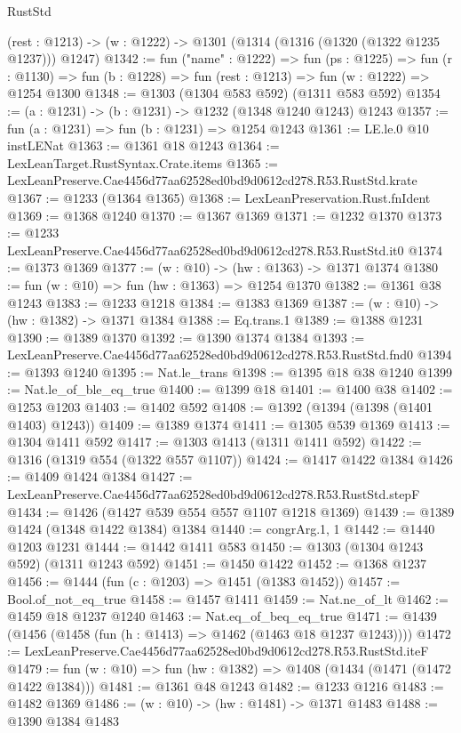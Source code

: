 \begin{lexlean}{RustStd}
\begin{coremodule}
  (rest : @1213) -> (w : @1222) -> @1301 (@1314 (@1316 (@1320 (@1322 @1235 @1237))) @1247)
@1342 := fun ("name" : @1222) =>
  fun (ps : @1225) =>
  fun (r : @1130) => fun (b : @1228) => fun (rest : @1213) => fun (w : @1222) => @1254 @1300
@1348 := @1303 (@1304 @583 @592) (@1311 @583 @592)
@1354 := (a : @1231) -> (b : @1231) -> @1232 (@1348 @1240 @1243) @1243
@1357 := fun (a : @1231) => fun (b : @1231) => @1254 @1243
@1361 := LE.le.{0} @10 instLENat
@1363 := @1361 @18 @1243
@1364 := LexLeanTarget.RustSyntax.Crate.items
@1365 := LexLeanPreserve.Cae4456d77aa62528ed0bd9d0612cd278.R53.RustStd.krate
@1367 := @1233 (@1364 @1365)
@1368 := LexLeanPreservation.Rust.fnIdent
@1369 := @1368 @1240
@1370 := @1367 @1369
@1371 := @1232 @1370
@1373 := @1233 LexLeanPreserve.Cae4456d77aa62528ed0bd9d0612cd278.R53.RustStd.it0
@1374 := @1373 @1369
@1377 := (w : @10) -> (hw : @1363) -> @1371 @1374
@1380 := fun (w : @10) => fun (hw : @1363) => @1254 @1370
@1382 := @1361 @38 @1243
@1383 := @1233 @1218
@1384 := @1383 @1369
@1387 := (w : @10) -> (hw : @1382) -> @1371 @1384
@1388 := Eq.trans.{1}
@1389 := @1388 @1231
@1390 := @1389 @1370
@1392 := @1390 @1374 @1384
@1393 := LexLeanPreserve.Cae4456d77aa62528ed0bd9d0612cd278.R53.RustStd.fnd0
@1394 := @1393 @1240
@1395 := Nat.le_trans
@1398 := @1395 @18 @38 @1240
@1399 := Nat.le_of_ble_eq_true
@1400 := @1399 @18
@1401 := @1400 @38
@1402 := @1253 @1203
@1403 := @1402 @592
@1408 := @1392 (@1394 (@1398 (@1401 @1403) @1243))
@1409 := @1389 @1374
@1411 := @1305 @539 @1369
@1413 := @1304 @1411 @592
@1417 := @1303 @1413 (@1311 @1411 @592)
@1422 := @1316 (@1319 @554 (@1322 @557 @1107))
@1424 := @1417 @1422 @1384
@1426 := @1409 @1424 @1384
@1427 := LexLeanPreserve.Cae4456d77aa62528ed0bd9d0612cd278.R53.RustStd.stepF
@1434 := @1426 (@1427 @539 @554 @557 @1107 @1218 @1369)
@1439 := @1389 @1424 (@1348 @1422 @1384) @1384
@1440 := congrArg.{1, 1}
@1442 := @1440 @1203 @1231
@1444 := @1442 @1411 @583
@1450 := @1303 (@1304 @1243 @592) (@1311 @1243 @592)
@1451 := @1450 @1422
@1452 := @1368 @1237
@1456 := @1444 (fun (c : @1203) => @1451 (@1383 @1452))
@1457 := Bool.of_not_eq_true
@1458 := @1457 @1411
@1459 := Nat.ne_of_lt
@1462 := @1459 @18 @1237 @1240
@1463 := Nat.eq_of_beq_eq_true
@1471 := @1439 (@1456 (@1458 (fun (h : @1413) => @1462 (@1463 @18 @1237 @1243))))
@1472 := LexLeanPreserve.Cae4456d77aa62528ed0bd9d0612cd278.R53.RustStd.iteF
@1479 := fun (w : @10) => fun (hw : @1382) => @1408 (@1434 (@1471 (@1472 @1422 @1384)))
@1481 := @1361 @48 @1243
@1482 := @1233 @1216
@1483 := @1482 @1369
@1486 := (w : @10) -> (hw : @1481) -> @1371 @1483
@1488 := @1390 @1384 @1483

\end{coremodule}
\end{lexlean}
